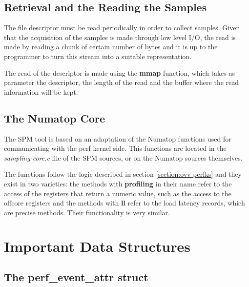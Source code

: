 \subsection{Retrieval and the Reading the Samples}\label{section:retr-reaf}

The file descriptor must be read periodically in order to collect samples. Given that the acquisition of the samples is made through low level I/O, the read is made by reading a chunk of certain number of bytes and it is up to the programmer to turn this stream into a suitable representation. 

The read of the descriptor is made using the \textbf{mmap} function, which takes as parameter the descriptor, the length of the read and the buffer where the read information will be kept.

\subsection{The Numatop Core}\label{section:Numatop-core}
The SPM tool is based on an adaptation of the Numatop functions used for communicating with the perf kernel side. This functions are located in the \textit{sampling-core.c} file of the SPM sources, or on the Numatop sources themselves.

The functions follow the logic described in section \ref{section:ovv-perfks} and they exist in two varieties: the methods with \textbf{profiling} in their name refer to the access of the registers that return a numeric value, such as the access to the offcore registers and the methods with \textbf{ll} refer to the load latency records, which are precise methods. Their functionality is very similar. 

\section{Important Data Structures}\label{section:important-structs}

\subsection{The perf\_event\_attr struct}\label{section:pea-stru}

